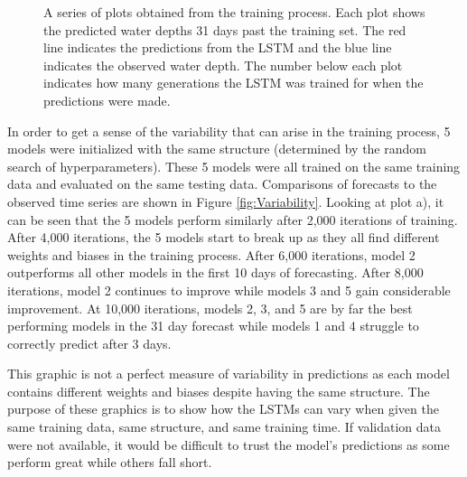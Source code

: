 \begin{figure}[hbt!]
    \caption{A series of plots obtained from the training process. Each plot shows the predicted water depths 31 days past the training set. The red line indicates the predictions from the LSTM and the blue line indicates the observed water depth. The number below each plot indicates how many generations the LSTM was trained for when the predictions were made.}
    \label{fig:Training}
\end{figure}
\FloatBarrier

In order to get a sense of the variability that can arise in the training process, 5 models were initialized with the same structure (determined by the random search of hyperparameters). These 5 models were all trained on the same training data and evaluated on the same testing data. Comparisons of forecasts to the observed time series are shown in Figure \ref{fig:Variability}. Looking at plot a), it can be seen that the 5 models perform similarly after 2,000 iterations of training. After 4,000 iterations, the 5 models start to break up as they all find different weights and biases in the training process. After 6,000 iterations, model 2 outperforms all other models in the first 10 days of forecasting. After 8,000 iterations, model 2 continues to improve while models 3 and 5 gain considerable improvement. At 10,000 iterations, models 2, 3, and 5 are by far the best performing models in the 31 day forecast while models 1 and 4 struggle to correctly predict after 3 days. 

This graphic is not a perfect measure of variability in predictions as each model contains different weights and biases despite having the same structure. The purpose of these graphics is to show how the LSTMs can vary when given the same training data, same structure, and same training time. If validation data were not available, it would be difficult to trust the model's predictions as some perform great while others fall short. 

